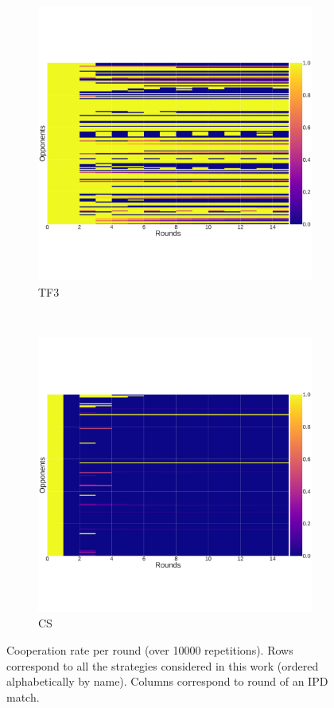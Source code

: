 \documentclass[10pt,journal]{IEEEtran}
\begin{document}
\begin{figure}[!hbtp]
    \begin{subfigure}[t]{.5\columnwidth}
        \centering
        \includegraphics[width=\columnwidth]{img/cooperation_0_0_10000_TF3_array.pdf}
        \caption{TF3}
    \end{subfigure}%
    ~
    \begin{subfigure}[t]{.5\columnwidth}
        \centering
        \includegraphics[width=\columnwidth]{img/cooperation_0_0_10000_CS_array.pdf}
        \caption{CS}
    \end{subfigure}
    \caption{Cooperation rate per round (over 10000 repetitions). Rows
        correspond to all the strategies considered in this work (ordered
    alphabetically by name). Columns correspond to round of an IPD match.}
    \label{fig:cooperation_rates}
\end{figure}
\end{document}
